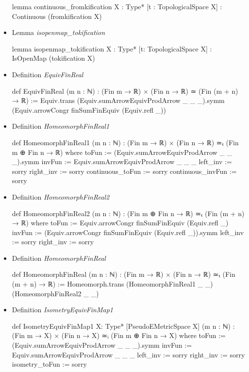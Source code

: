 \documentclass[colorinlistoftodos]{article}
\begin{document}
\begin{itemize}
\begin{leancode}
lemma continuous_fromkification {X : Type*} [t : TopologicalSpace X] :
Continuous (fromkification X)
\end{leancode}
  \item Lemma \emph{isopenmap\_tokification}
\begin{leancode}
lemma isopenmap_tokification {X : Type*} [t: TopologicalSpace X] :
IsOpenMap (tokification X)
\end{leancode}
  \item Definition \emph{EquivFinReal}
\begin{leancode}
def EquivFinReal (m n : ℕ) : (Fin m → ℝ) × (Fin n → ℝ) ≃ (Fin (m + n) → ℝ) :=
Equiv.trans (Equiv.sumArrowEquivProdArrow _ _ _).symm
  (Equiv.arrowCongr finSumFinEquiv (Equiv.refl _))
\end{leancode}
  \item Definition \emph{HomeomorphFinReal1}
\begin{leancode}
def HomeomorphFinReal1 (m n : ℕ) : (Fin m → ℝ) × (Fin n → ℝ) ≃ₜ (Fin m ⊕ Fin n → ℝ) where
  toFun := (Equiv.sumArrowEquivProdArrow _ _ _).symm
  invFun := Equiv.sumArrowEquivProdArrow _ _ _
  left_inv := sorry
  right_inv := sorry
  continuous_toFun := sorry
  continuous_invFun := sorry
\end{leancode}
  \item Definition \emph{HomeomorphFinReal2}
\begin{leancode}
def HomeomorphFinReal2 (m n : ℕ) : (Fin m ⊕ Fin n → ℝ) ≃ₜ (Fin (m + n) → ℝ) where
  toFun := Equiv.arrowCongr finSumFinEquiv (Equiv.refl _)
  invFun := (Equiv.arrowCongr finSumFinEquiv (Equiv.refl _)).symm
  left_inv := sorry
  right_inv := sorry
\end{leancode}
  \item Definition \emph{HomeomorphFinReal}
\begin{leancode}
def HomeomorphFinReal (m n : ℕ) : (Fin m → ℝ) × (Fin n → ℝ) ≃ₜ (Fin (m + n) → ℝ) :=
  Homeomorph.trans (HomeomorphFinReal1 _ _) (HomeomorphFinReal2 _ _)
\end{leancode}
  \item Definition \emph{IsometryEquivFinMap1}
\begin{leancode}
def IsometryEquivFinMap1 {X: Type*} [PseudoEMetricSpace X] (m n : ℕ) :
(Fin m → X) × (Fin n → X) ≃ᵢ (Fin m ⊕ Fin n → X) where
  toFun := (Equiv.sumArrowEquivProdArrow _ _ _).symm
  invFun := Equiv.sumArrowEquivProdArrow _ _ _
  left_inv := sorry
  right_inv := sorry
  isometry_toFun := sorry
\end{leancode}

\end{itemize}
\end{document}
